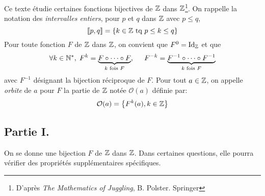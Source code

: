 Ce texte étudie certaines fonctions bijectives de $\mathbb{Z}$ dans $\mathbb{Z}$\footnote{D'après \emph{The Mathematics of Juggling}, B. Polster. Springer}.\newline
On rappelle la notation des \emph{intervalles entiers}, pour $p$ et $q$ dans $\mathbb{Z}$ avec $p \leq q$,
\begin{displaymath}
 \llbracket p,q \rrbracket = \left\lbrace k\in \mathbb{Z} \text{ tq } p \leq k \leq q \right\rbrace 
\end{displaymath}
Pour toute fonction $F$ de $\mathbb{Z}$ dans $\mathbb{Z}$, on convient que $F^0 = \operatorname{Id}_{\mathbb{Z}}$ et que 
\begin{displaymath}
 \forall k \in \mathbb{N}^*, \; F^k = \underset{ k \text{ fois } F}{\underbrace{F\circ \cdots \circ F}}, \hspace{0.5cm}
 F^{-k} = \underset{ k \text{ fois } F}{\underbrace{F^{-1}\circ \cdots \circ F^{-1}}}
\end{displaymath}
avec $F^{-1}$ désignant la bijection réciproque de $F$.\newline
Pour tout $a\in \mathbb{Z}$, on appelle \emph{orbite} de $a$ pour $F$ la partie de $\mathbb{Z}$ notée $\mathcal{O}(a)$ définie par:
\begin{displaymath}
 \mathcal{O}(a) = \left\lbrace F^k(a), k\in \mathbb{Z}\right\rbrace 
\end{displaymath}

\subsection*{Partie I.}
On se donne une bijection $F$ de $\mathbb{Z}$ dans $\mathbb{Z}$. Dans certaines questions, elle pourra vérifier des propriétés supplémentaires spécifiques.

